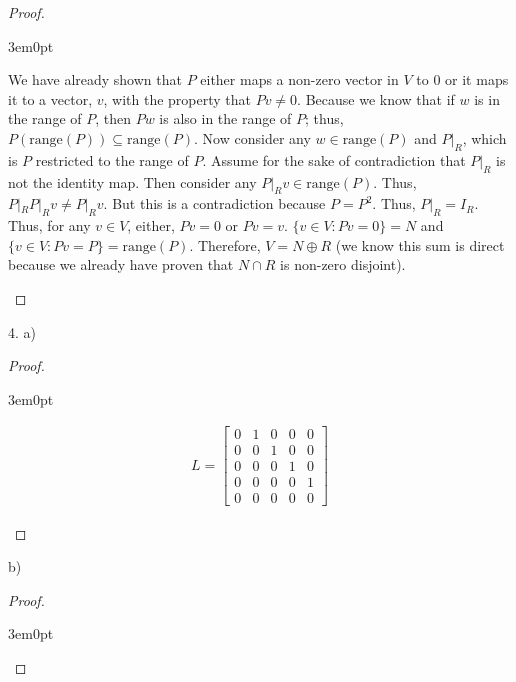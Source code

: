 \documentclass[11pt]{article}
\newenvironment{myproof}
{\begin{proof} \begin{adjustwidth}{3em}{0pt}$ $\par\nobreak\ignorespaces}
{\end{adjustwidth} \end{proof}}
\begin{document}
\begin{flushleft}
\begin{myproof}
We have already shown that $P$ either maps a non-zero vector in $V$ to 0 or it maps it to a vector, $v$, with the property that $Pv \neq 0$. Because we know that if $w$ is in the range of $P$, then $Pw$ is also in the range of $P$; thus, $P(\text{range}(P)) \subseteq \text{range}(P)$. Now consider any $w \in \text{range}(P)$ and $P|_{R}$, which is $P$ restricted to the range of $P$. Assume for the sake of contradiction that $P|_R$ is not the identity map. Then consider any $P|_Rv \in \text{range}(P)$. Thus, $P|_RP|_Rv \neq P|_Rv$. But this is a contradiction because $P = P^2$. Thus, $P|_R = I_R$. Thus, for any $v \in V$, either, $Pv = 0$ or $Pv = v$. $\{ v \in V: Pv = 0 \} = N$ and $\{ v \in V: Pv = P \} = \text{range}(P)$. Therefore, $V = N \oplus R$ (we know this sum is direct because we already have proven that $N \cap R$ is non-zero disjoint).

\end{myproof}

\newpage

4. a)

\begin{myproof}

\begin{align*}
L=
\begin{bmatrix}
0 & 1 & 0 & 0 & 0 \\
0 & 0 & 1 & 0 & 0 \\
0 & 0 & 0 & 1 & 0 \\
0 & 0 & 0 & 0 & 1 \\
0 & 0 & 0 & 0 & 0
\end{bmatrix}
\end{align*}

\end{myproof}

b)

\begin{myproof}


\end{myproof}
\end{flushleft}
\end{document}
